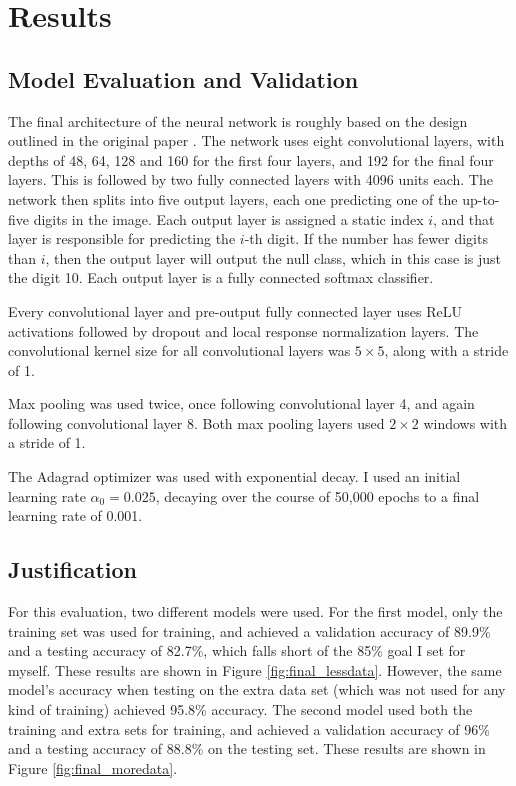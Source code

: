 \documentclass[12pt]{article}
\begin{document}
\section{Results}
\subsection{Model Evaluation and Validation} \label{sssec:evaluation}
The final architecture of the neural network is roughly based on the design outlined in the original paper \cite{svhn_original_paper}.
The network uses eight convolutional layers, with depths of 48, 64, 128 and 160 for the first four layers, and 192 for the final four layers.
This is followed by two fully connected layers with 4096 units each.
The network then splits into five output layers, each one predicting one of the up-to-five digits in the image. 
Each output layer is assigned a static index $i$, and that layer is responsible for predicting the $i$-th digit. 
If the number has fewer digits than $i$, then the output layer will output the null class, which in this case is just the digit 10.
Each output layer is a fully connected softmax classifier.

Every convolutional layer and pre-output fully connected layer uses ReLU\cite{relu} activations followed by dropout\cite{svhn_dropout} and local response normalization\cite{svhn_lrn} layers.
The convolutional kernel size for all convolutional layers was $5 \times 5$, along with a stride of 1.

Max pooling was used twice, once following convolutional layer 4, and again following convolutional layer 8.
Both max pooling layers used $2 \times 2$ windows with a stride of 1.

The Adagrad optimizer was used with exponential decay. I used an initial learning rate $\alpha_0 = 0.025$, decaying over the course of 50,000 epochs to a final learning rate of 0.001.

\subsection{Justification} \label{sssec:justification}
For this evaluation, two different models were used.
For the first model, only the training set was used for training, and achieved a validation accuracy of 89.9\% and a testing accuracy of 82.7\%, which falls short of the 85\% goal I set for myself.
These results are shown in Figure \ref{fig:final_lessdata}.
However, the same model's accuracy when testing on the extra data set (which was not used for any kind of training) achieved 95.8\% accuracy.
The second model used both the training and extra sets for training, and achieved a validation accuracy of 96\% and a testing accuracy of 88.8\% on the testing set.
These results are shown in Figure \ref{fig:final_moredata}.
\end{document}
